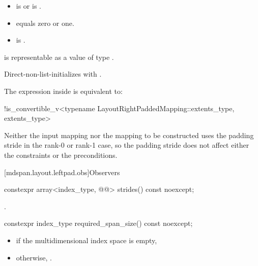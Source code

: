 \begin{itemdescr}
\pnum
\constraints
\begin{itemize}
\item
{}
is  or\newline
{}
is .
\item
{} equals zero or one.
\item
{}
is .
\end{itemize}

\pnum
\expects
{} is representable as
a value of type .

\pnum
\effects
Direct-non-list-initializes  with .

\pnum
\remarks
The expression inside  is equivalent to:
\begin{codeblock}
!is_convertible_v<typename LayoutRightPaddedMapping::extents_type, extents_type>
\end{codeblock}

\begin{note}
Neither the input mapping nor the mapping to be constructed
uses the padding stride in the rank-0 or rank-1 case,
so the padding stride does not affect
either the constraints or the preconditions.
\end{note}
\end{itemdescr}

[mdspan.layout.leftpad.obs]{Observers}

\begin{itemdecl}
constexpr array<index_type, @@> strides() const noexcept;
\end{itemdecl}

\begin{itemdescr}
\pnum
\returns
{}.
\end{itemdescr}

\begin{itemdecl}
constexpr index_type required_span_size() const noexcept;
\end{itemdecl}

\begin{itemdescr}
\pnum
\returns
\begin{itemize}
\item
{} if the multidimensional index space  is empty,
\item
otherwise, .
\end{itemize}
\end{itemdescr}

